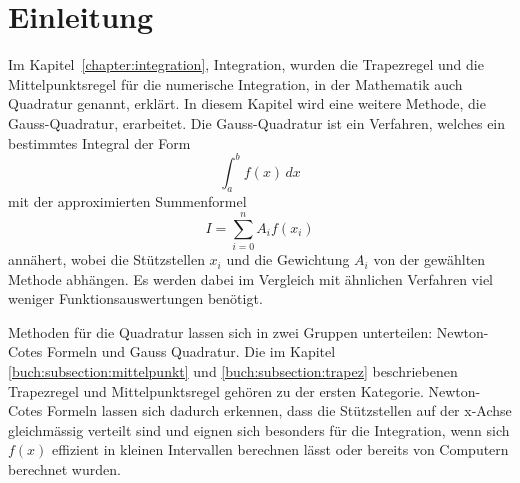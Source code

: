 %
%
%
\section{Einleitung\label{quadratur:section:einleitung}}

Im Kapitel~\ref{chapter:integration}, Integration, wurden die 
Trapezregel und die Mittelpunktsregel für die numerische Integration, 
in der Mathematik auch Quadratur genannt, erklärt. 
In diesem Kapitel wird eine weitere Methode, die Gauss-Quadratur, erarbeitet.
Die Gauss-Quadratur ist ein Verfahren, welches ein bestimmtes Integral der Form
\begin{equation}
    \int_{a}^{b} f(x) \,dx
\end{equation}
mit der approximierten Summenformel
\begin{equation}
    I = \sum_{i=0}^{n} A_i f(x_i)
\end{equation}
annähert, wobei die Stützstellen $x_i$ und die Gewichtung $A_i$ von der gewählten 
Methode abhängen. 
Es werden dabei im Vergleich mit ähnlichen Verfahren viel weniger Funktionsauswertungen benötigt.

Methoden für die Quadratur lassen sich in zwei Gruppen unterteilen: 
Newton-Cotes Formeln und Gauss Quadratur.
Die im Kapitel \ref{buch:subsection:mittelpunkt} und \ref{buch:subsection:trapez} beschriebenen
Trapezregel und Mittelpunktsregel gehören zu der ersten Kategorie.
Newton-Cotes Formeln lassen sich dadurch erkennen, dass die Stützstellen auf der x-Achse 
gleichmässig verteilt sind und eignen sich besonders für die Integration, wenn sich $f(x)$ 
effizient in kleinen Intervallen berechnen lässt oder bereits von Computern berechnet wurden.







